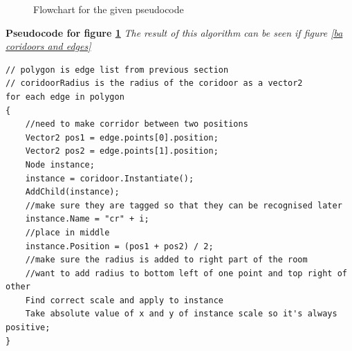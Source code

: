 \documentclass{article}
\begin{document}
\begin{figure}[h]
    \centering
    \caption{Flowchart for the given pseudocode}
    \label{generate coridoor}
\end{figure}

\pagebreak

\textbf{Pseudocode for figure \ref{generate coridoor}} \linebreak
\textit{The result of this algorithm can be seen if figure \ref{ba coridoors and edges}}
\begin{lstlisting}
// polygon is edge list from previous section
// coridoorRadius is the radius of the coridoor as a vector2
for each edge in polygon
{
	//need to make corridor between two positions
    Vector2 pos1 = edge.points[0].position;
    Vector2 pos2 = edge.points[1].position;
    Node instance;
    instance = coridoor.Instantiate();
    AddChild(instance);
    //make sure they are tagged so that they can be recognised later
    instance.Name = "cr" + i;
    //place in middle
    instance.Position = (pos1 + pos2) / 2;
    //make sure the radius is added to right part of the room
    //want to add radius to bottom left of one point and top right of other
    Find correct scale and apply to instance
    Take absolute value of x and y of instance scale so it's always positive;
}
\end{lstlisting} 
\end{document}
